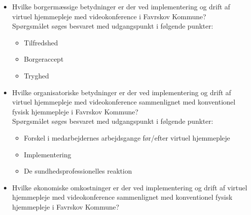 \begin{itemize}
	\item Hvilke borgermæssige betydninger er der ved implementering og drift af virtuel hjemmepleje med videokonference i Favrskov Kommune? \\Spørgsmålet søges besvaret med udgangspunkt i følgende punkter:
	\begin{itemize}
	\item Tilfredshed
	\item Borgeraccept
	\item Tryghed
\end{itemize}
\end{itemize}

\begin{itemize}
	\item Hvilke organisatoriske betydninger er der ved implementering og drift af virtuel hjemmepleje med videokonference sammenlignet med konventionel fysisk hjemmepleje i Favrskov Kommune? \\Spørgsmålet søges besvaret med udgangspunkt i følgende punkter:
	\begin{itemize}
	\item Forskel i medarbejdernes arbejdsgange før/efter virtuel hjemmepleje
	\item Implementering
	\item De sundhedsprofessionelles reaktion

\end{itemize}
\end{itemize}


\begin{itemize}
	\item Hvilke økonomiske omkostninger er der ved implementering og drift af virtuel hjemmepleje med videokonference sammenlignet med konventionel fysisk hjemmepleje i Favrskov Kommune?
\end{itemize}

